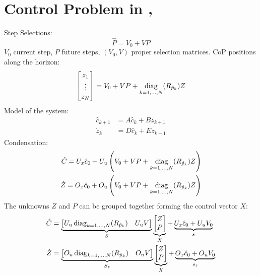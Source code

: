 \section{Control Problem in , }

Step Selections:
\begin{equation}
	\hat{P}= V_0 + VP
\end{equation}
$V_0$ current step, $P$ future steps, $(V_0,V)$ proper selection matrices. CoP positions along the horizon:
\begin{equation}
	\begin{bmatrix}
		z_1\\\vdots\\z_N
	\end{bmatrix}=V_0 + VP + \mathop{\mathrm{diag}}_{k=1,\dots,N}(R_{\hat{p}_k})Z
\end{equation}
Model of the system:
\begin{equation}
			\begin{split}
				\hat{c}_{k+1} &= A \hat{c}_k + B z_{k+1}\\
				\dot{z}_k &= D \hat{c}_k + E z_{k+1}
			\end{split}
\end{equation}
Condensation:
\begin{equation}
		\begin{split}
			\hat{C} = U_x\hat{c}_0 + U_u\left(V_0 + VP + \mathop{\mathrm{diag}}_{k=1,\dots,N}(R_{\hat{p}_k})Z\right)\\
			\dot{Z} = O_x\hat{c}_0 + O_u\left(V_0 + VP + \mathop{\mathrm{diag}}_{k=1,\dots,N}(R_{\hat{p}_k})Z\right)
		\end{split}
\end{equation}
The unknowns $Z$ and $P$ can be grouped together forming the control vector $X$:
\begin{equation}
		\begin{split}
			\hat{C} &= \underbrace{\begin{bmatrix}U_u\mathop{\mathrm{diag}}_{k=1,\dots,N}(R_{\hat{p}_k}) & U_uV\end{bmatrix}}_{S}\underbrace{\begin{bmatrix}Z\\P\end{bmatrix}}_{X} + \underbrace{U_x\hat{c}_0 + U_uV_0}_{s}\\
			\dot{Z} &= \underbrace{\begin{bmatrix}O_u\mathop{\mathrm{diag}}_{k=1,\dots,N}(R_{\hat{p}_k}) & O_uV\end{bmatrix}}_{S_{\dot{z}}}\underbrace{\begin{bmatrix}Z\\P\end{bmatrix}}_{X} + \underbrace{O_x\hat{c}_0 + O_u V_0}_{s_{\dot{z}}}
		\end{split}
\end{equation}
